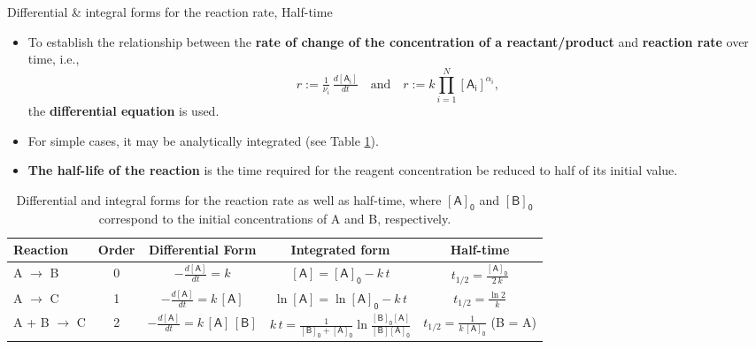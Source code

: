 \begin{frame}[<+->]{Differential \& integral forms for the reaction rate, Half-time}
%
\footnotesize
\begin{itemize}
	\item To establish the relationship between the {\bf rate of change of the concentration of a reactant/product}  and  {\bf reaction rate} over time, i.e., 
	$$r := \tfrac{1}{\nu_i}  \, \tfrac{d [ \mathsf{A_i}]}{dt} \quad \mbox{and} \quad 
		r := k \prod_{i=1}^{N} [\mathsf{A_i}]^{\alpha_i},$$
	the {\bf differential equation} is used.
	\item For simple cases, it may be analytically integrated (see Table \ref{tab:differential-integral-forms}).
	\item \alert{\bf The half-life of the reaction} is the time required for the reagent concentration be reduced to half of its initial
value.
\end{itemize}
\begin{table}
\footnotesize
	\begin{tabular*}{1\textwidth}{@{\extracolsep{\fill}}lcccc}
		\toprule 
		Reaction & Order & Differential Form & Integrated form & Half-time \\[5pt]
		\midrule 
		A $\rightarrow$ B & 0 & $-\tfrac{d \mathsf{[A]}}{dt} = k$ & $\mathsf{[A]} = \mathsf{[A]_0} - k\,t$ & 
		$t_{1/2} = \tfrac{\mathsf{[A]_0}}{2\,k}$ \\[5pt]
		A $\rightarrow$ C & 1 & $-\tfrac{d \mathsf{[A]}}{dt} = k\, \mathsf{[A]}$ & $\ln \mathsf{[A]} = \ln \mathsf{[A]_0} - k\,t$ & $t_{1/2} = \tfrac{\ln 2}{k}$ \\[5pt]
		A + B  $\rightarrow$ C & 2 & $-\tfrac{d \mathsf{[A]}}{dt} = k\, \mathsf{[A]}\, \mathsf{[B]}$ & 
		$k\,t = \tfrac{1}{\mathsf{[B]_0} + \mathsf{[A]_0}} \ln \tfrac{\mathsf{[B]_0} \mathsf{[A]}}{\mathsf{[B]} \mathsf{[A]_0}}$ & $t_{1/2} = \tfrac{1}{k \, \mathsf{[A]_0}}$ (B = A) \\[5pt]
		\bottomrule
	\end{tabular*}
	\caption{\label{tab:differential-integral-forms} \footnotesize Differential and integral forms for the reaction rate as well as half-time, where $\mathsf{[A]_0}$ and $\mathsf{[B]_0}$ correspond to the initial concentrations of A and B, respectively.}
\end{table}
%
\end{frame}
%
